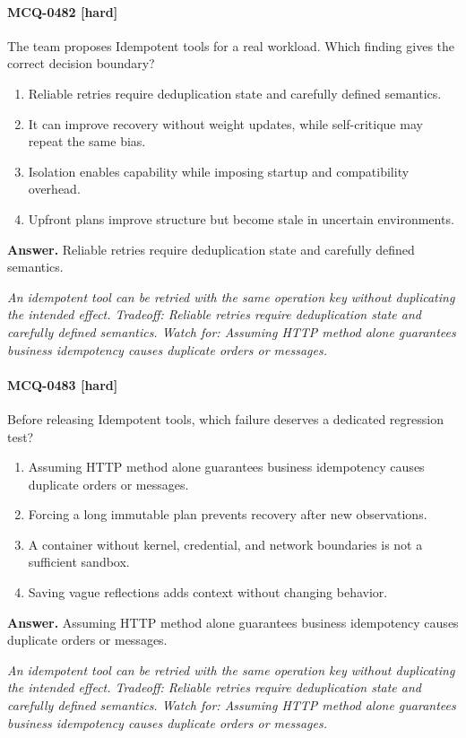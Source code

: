 \paragraph{MCQ-0482 [hard]} The team proposes Idempotent tools for a real workload. Which finding gives the correct decision boundary?
\begin{enumerate}[label=\Alph*.]
\item Reliable retries require deduplication state and carefully defined semantics.
\item It can improve recovery without weight updates, while self-critique may repeat the same bias.
\item Isolation enables capability while imposing startup and compatibility overhead.
\item Upfront plans improve structure but become stale in uncertain environments.
\end{enumerate}
\noindent\textbf{Answer.} Reliable retries require deduplication state and carefully defined semantics.
\par\textit{An idempotent tool can be retried with the same operation key without duplicating the intended effect. Tradeoff: Reliable retries require deduplication state and carefully defined semantics. Watch for: Assuming HTTP method alone guarantees business idempotency causes duplicate orders or messages.}
\paragraph{MCQ-0483 [hard]} Before releasing Idempotent tools, which failure deserves a dedicated regression test?
\begin{enumerate}[label=\Alph*.]
\item Assuming HTTP method alone guarantees business idempotency causes duplicate orders or messages.
\item Forcing a long immutable plan prevents recovery after new observations.
\item A container without kernel, credential, and network boundaries is not a sufficient sandbox.
\item Saving vague reflections adds context without changing behavior.
\end{enumerate}
\noindent\textbf{Answer.} Assuming HTTP method alone guarantees business idempotency causes duplicate orders or messages.
\par\textit{An idempotent tool can be retried with the same operation key without duplicating the intended effect. Tradeoff: Reliable retries require deduplication state and carefully defined semantics. Watch for: Assuming HTTP method alone guarantees business idempotency causes duplicate orders or messages.}
